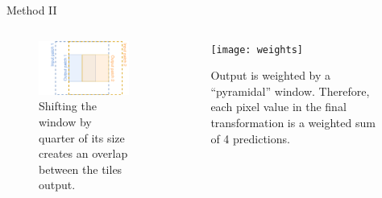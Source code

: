 \documentclass[t]{beamer}
\begin{document}
\begin{frame}{Method II}

\begin{columns}

\begin{column}{0.5\textwidth}
\begin{figure}
\centering
\includegraphics[width=0.8\linewidth]{pyramid}
\caption{Shifting the window by quarter of its size creates an overlap between
the tiles output.}
\end{figure}\pause
\end{column}

\begin{column}{0.5\textwidth}
\begin{figure}
\centering
\texttt{[image: weights]}
\caption{Output is weighted by a ``pyramidal'' window.
Therefore, each pixel value in the final transformation is a weighted sum of 4 predictions.}
\end{figure}
\end{column}

\end{columns}

\end{frame}
\end{document}
